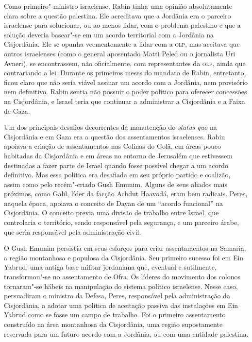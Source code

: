 Como primeiro"-ministro israelense, Rabin tinha uma opinião absolutamente
clara sobre a questão palestina. Ele acreditava que a Jordânia era o
parceiro israelense para solucionar, ou ao menos lidar, com o problema
palestino e que a solução deveria basear"-se em um acordo territorial com
a Jordânia na Cisjordânia. Ele se opunha veementemente a lidar com a \textsc{olp},
mas aceitava que outros israelenses (como o general aposentado Matti
Peled ou o jornalista Uri Avneri), se encontrassem, não oficialmente,
com representantes da \textsc{olp}, ainda que contrariando a lei. Durante os
primeiros meses do mandato de Rabin, entretanto, ficou claro que não
seria viável assinar um acordo com a Jordânia, nem provisório nem
definitivo. Rabin sentia não possuir o poder político para oferecer
concessões na Cisjordânia, e Israel teria que continuar a administrar a
Cisjordânia e a Faixa de Gaza.

Um dos principais desafios decorrentes da manutenção do \textit{status
quo} na Cisjordânia e em Gaza era a questão dos assentamentos
israelenses. Rabin apoiava a criação de assentamentos nas Colinas do
Golã, em áreas pouco habitadas da Cisjordânia e em áreas no entorno de
Jerusalém que estivessem destinadas a fazer parte de Israel quando fosse
possível chegar a um acordo definitivo. Mas essa política era desafiada
em seu próprio partido e coalizão, assim como pelo recém"-criado Gush
Emunim. Alguns de seus aliados mais próximos, como Galil, líder da
facção Achdut Haavodá, eram bem radicais. Peres, naquela época, apoiava
o conceito de Dayan de um ``acordo funcional'' na Cisjordânia. O
conceito previa uma divisão de trabalho entre Israel, que controlaria o
território, sendo responsável pela segurança, e um parceiro árabe, que
seria responsável pela administração civil.

O Gush Emunim persistia em seus esforços para criar assentamentos na
Samaria, a região montanhosa e populosa da Cisjordânia. Seu primeiro
sucesso foi em Ein Yabrud, uma antiga base militar jordaniana que,
eventual e sutilmente, transformou"-se no assentamento de Ofra. Os
líderes do movimento dos colonos tornaram"-se hábeis na manipulação do
sistema político israelense. Nesse caso, persuadiram o ministro da
Defesa, Peres, responsável pela administração da Cisjordânia, a adotar
uma política de aceitação passiva das instalações em Ein Yabrud como se
fosse um campo de trabalho. Foi o primeiro assentamento construído na
área montanhosa da Cisjordânia, uma região supostamente reservada para um
futuro acordo com a Jordânia, ou com uma entidade palestina.

